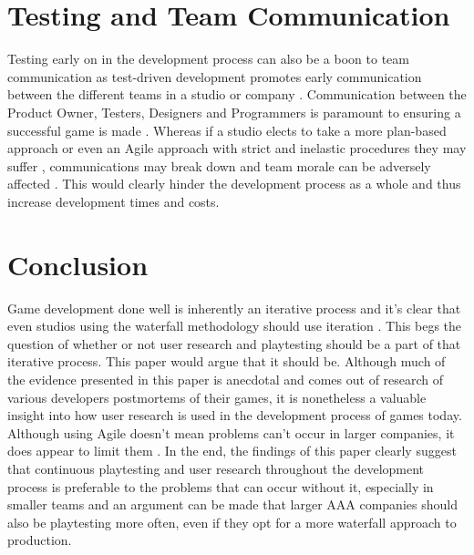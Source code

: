 \documentclass{scrartcl}
\begin{document}
\section{Testing and Team Communication}

Testing early on in the development process can also be a boon to team communication as test-driven development promotes early communication between the different teams in a studio or company \cite{gallardo2009continuous,}. Communication between the Product Owner, Testers, Designers and Programmers is paramount to ensuring a successful game is made \cite{mcdaniel2015communication,}. 
Whereas if a studio elects to take a more plan-based approach or even an Agile approach with strict and inelastic procedures they may suffer \cite{cooke2012everything,} \cite{davis2012agile,}, communications may break down and team morale can be adversely affected \cite{cunningham2005costs,}. This would clearly hinder the development process as a whole and thus increase development times and costs.


\section{Conclusion}

Game development done well is inherently an iterative process and it's clear that even studios using the waterfall methodology should use iteration \cite{al2014towards,} \cite{o2015towards,}. This begs the question of whether or not user research and playtesting should be a part of that iterative process. This paper would argue that it should be. Although much of the evidence presented in this paper is anecdotal and comes out of research of various developers postmortems of their games, it is nonetheless a valuable insight into how user research is used in the development process of games today. Although using Agile doesn't mean problems can't occur in larger companies, it does appear to limit them \cite{rico2009business,} \cite{batra2010balancing,}. In the end, the findings of this paper clearly suggest that continuous playtesting and user research throughout the development process is preferable to the problems that can occur without it, especially in smaller teams and an argument can be made that larger AAA companies should also be playtesting more often, even if they opt for a more waterfall approach to production.



\end{document}
